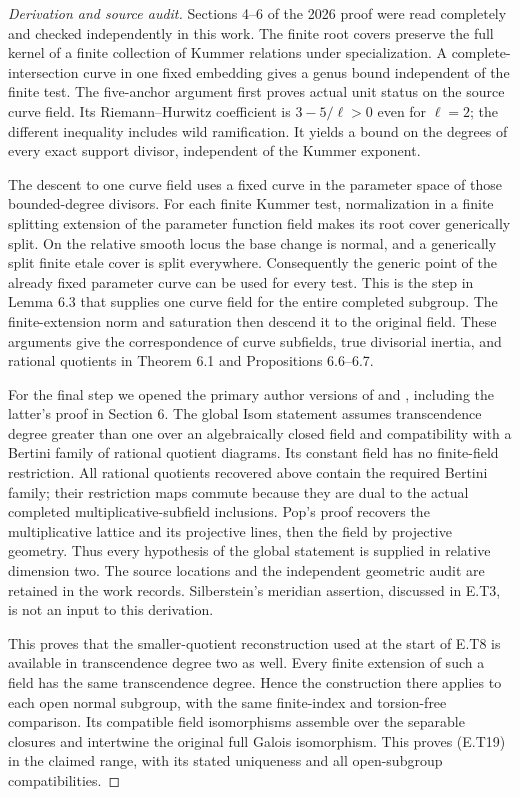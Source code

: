 \begin{proof}[Derivation and source audit]
Sections 4--6 of the 2026 proof were read completely and checked
independently in this work.  The finite root covers preserve
the full kernel of a finite collection of Kummer relations
under specialization.  A complete-intersection curve in one
fixed embedding gives a genus bound independent of the finite
test.  The five-anchor argument first proves actual unit
status on the source curve field.  Its Riemann--Hurwitz
coefficient is $3-5/\ell>0$ even for $\ell=2$; the different
inequality includes wild ramification.  It yields a bound on
the degrees of every exact support divisor, independent of
the Kummer exponent.

The descent to one curve field uses a fixed curve in the
parameter space of those bounded-degree divisors.  For each
finite Kummer test, normalization in a finite splitting
extension of the parameter function field makes its root cover
generically split.  On the relative smooth locus the base
change is normal, and a generically split finite etale cover
is split everywhere.  Consequently the generic point of the
already fixed parameter curve can be used for every test.
This is the step in Lemma 6.3 that supplies one curve field
for the entire completed subgroup.  The finite-extension
norm and saturation then descend it to the original field.
These arguments give the correspondence of curve subfields,
true divisorial inertia, and rational quotients in
Theorem 6.1 and Propositions 6.6--6.7.

For the final step we opened the primary author versions of
\cite[Theorem 2.1(2)]{Pop2012BogomolovI} and
\cite[Fact/Definition 43 and Theorem 45]{Pop2012DecompositionGraphs},
including the latter's proof in Section 6.  The global Isom
statement assumes transcendence degree greater than one over
an algebraically closed field and compatibility with a
Bertini family of rational quotient diagrams.  Its constant
field has no finite-field restriction.  All rational quotients
recovered above contain the required Bertini family; their
restriction maps commute because they are dual to the actual
completed multiplicative-subfield inclusions.  Pop's proof
recovers the multiplicative lattice and its projective lines,
then the field by projective geometry.  Thus every hypothesis
of the global statement is supplied in relative dimension two.
The source locations and the independent geometric audit are
retained in the work records.  Silberstein's meridian assertion,
discussed in E.T3, is not an input to this derivation.

This proves that the smaller-quotient reconstruction used at
the start of E.T8 is available in transcendence degree two as
well.  Every finite extension of such a field has the same
transcendence degree.  Hence the construction there applies to
each open normal subgroup, with the same finite-index and
torsion-free comparison.  Its compatible field isomorphisms
assemble over the separable closures and intertwine the
original full Galois isomorphism.  This proves (E.T19) in the
claimed range, with its stated uniqueness and all open-subgroup
compatibilities.


\end{proof}
